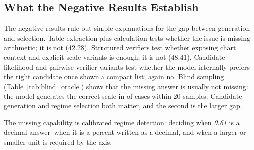 \subsection{What the Negative Results Establish}

The negative results rule out simple explanations for the gap between generation and selection. Table extraction plus calculation tests whether the issue is missing arithmetic; it is not (42.28). Structured verifiers test whether exposing chart context and explicit scale variants is enough; it is not (48.41). Candidate-likelihood and pairwise-verifier variants test whether the model internally prefers the right candidate once shown a compact list; again no. Blind sampling (Table~\ref{tab:blind_oracle}) shows that the missing answer is usually not missing: the model generates the correct scale in  of cases within 20 samples. Candidate generation and regime selection both matter, and the second is the larger gap.

The missing capability is calibrated regime detection: deciding when \textit{0.61} is a decimal answer, when it is a percent written as a decimal, and when a larger or smaller unit is required by the axis.
